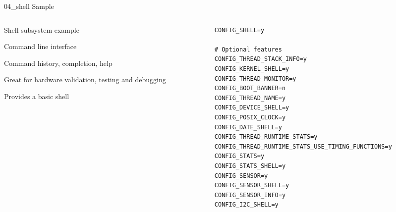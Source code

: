 \documentclass[10pt, aspectratio=169]{beamer}
\begin{document}
\begin{frame}[fragile]{04\_shell Sample}
  \begin{columns}
    \begin{column}{0.6\textwidth}
      \begin{description}
	\item [Description] Shell subsystem example\footnotemark
	\item [Shell] Command line interface
	\item Command history, completion, help
	\item Great for hardware validation, testing and debugging
	\item [Sample] Provides a basic shell
      \end{description}
    \end{column}
    \begin{column}{0.4\textwidth}
        {\fontsize{6}{6}\selectfont
  \begin{listing}[H]
    \begin{verbatim}
CONFIG_SHELL=y

# Optional features
CONFIG_THREAD_STACK_INFO=y
CONFIG_KERNEL_SHELL=y
CONFIG_THREAD_MONITOR=y
CONFIG_BOOT_BANNER=n
CONFIG_THREAD_NAME=y
CONFIG_DEVICE_SHELL=y
CONFIG_POSIX_CLOCK=y
CONFIG_DATE_SHELL=y
CONFIG_THREAD_RUNTIME_STATS=y
CONFIG_THREAD_RUNTIME_STATS_USE_TIMING_FUNCTIONS=y
CONFIG_STATS=y
CONFIG_STATS_SHELL=y
CONFIG_SENSOR=y
CONFIG_SENSOR_SHELL=y
CONFIG_SENSOR_INFO=y
CONFIG_I2C_SHELL=y
    \end{verbatim}
    \caption{\scriptsize{Excerpt from samples/04\_shell/prj.conf}}
  \end{listing}
        }
    \end{column}
  \end{columns}
\end{frame}
\end{document}

